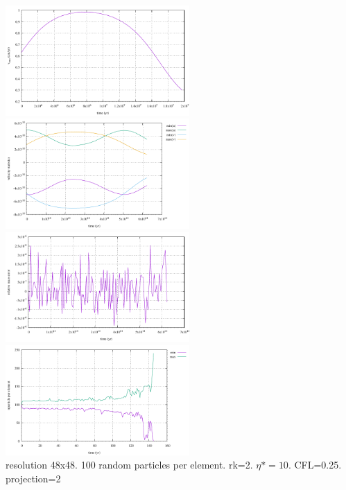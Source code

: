 \begin{center}
\includegraphics[width=7cm]{python_codes/fieldstone_67/sinking/vrms.pdf}
\includegraphics[width=7cm]{python_codes/fieldstone_67/sinking/vel.pdf}\\
\includegraphics[width=7cm]{python_codes/fieldstone_67/sinking/mass.pdf}
\includegraphics[width=7cm]{python_codes/fieldstone_67/sinking/nparticle_per_element.pdf}\\
{\captionfont resolution 48x48. 100 random particles per element. rk=2. $\eta*=10$. CFL=0.25. 
projection=2}
\end{center}


